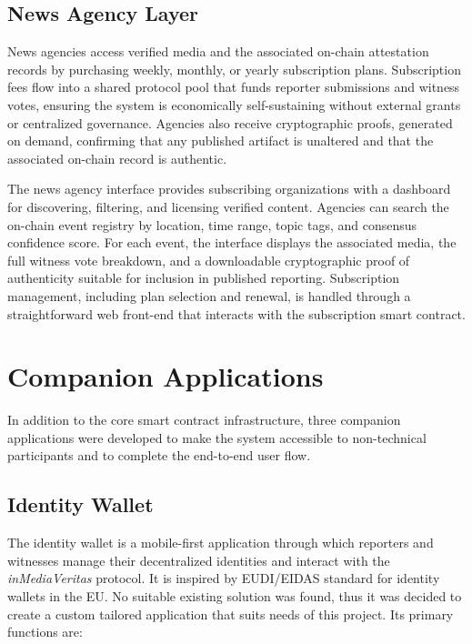 \documentclass[11pt]{article}
\begin{document}
\subsection{News Agency Layer}

News agencies access verified media and the associated on-chain attestation
records by purchasing weekly, monthly, or yearly subscription plans.
Subscription fees flow into a shared protocol pool that funds reporter
submissions and witness votes, ensuring the system is economically
self-sustaining without external grants or centralized governance. Agencies
also receive cryptographic proofs, generated on demand, confirming that any
published artifact is unaltered and that the associated on-chain record is
authentic.

The news agency interface provides subscribing organizations with a dashboard
for discovering, filtering, and licensing verified content. Agencies can search
the on-chain event registry by location, time range, topic tags, and consensus
confidence score. For each event, the interface displays the associated media,
the full witness vote breakdown, and a downloadable cryptographic proof of
authenticity suitable for inclusion in published reporting. Subscription
management, including plan selection and renewal, is handled through a
straightforward web front-end that interacts with the subscription smart contract.

\section{Companion Applications}

In addition to the core smart contract infrastructure, three companion
applications were developed to make the system accessible to non-technical
participants and to complete the end-to-end user flow.

\subsection{Identity Wallet}

The identity wallet is a mobile-first application through which reporters and
witnesses manage their decentralized identities and interact with the
\textit{inMediaVeritas} protocol. It is inspired by EUDI/EIDAS standard for identity wallets in the EU. No suitable existing solution was found, thus it was decided to create a custom tailored application that suits needs of this project. Its primary functions are:
\end{document}
